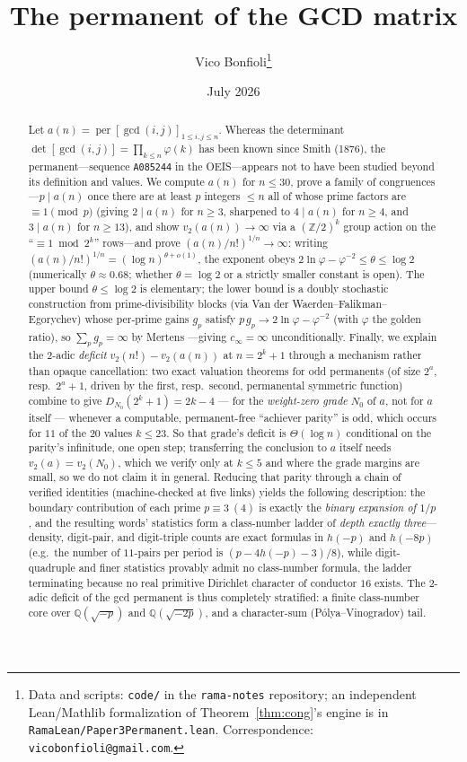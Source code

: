 \documentclass[11pt]{article}
\title{The permanent of the GCD matrix}
\author{Vico Bonfioli\thanks{Data and scripts: \texttt{code/} in the
\texttt{rama-notes} repository; an independent Lean/Mathlib formalization of
Theorem~\ref{thm:cong}'s engine is in \texttt{RamaLean/Paper3Permanent.lean}. Correspondence: \texttt{vicobonfioli@gmail.com}.}}
\date{July 2026}
\theoremstyle{remark}\newtheorem{remark}[theorem]{Remark}
\DeclareMathOperator{\perm}{per}
\begin{document}
\maketitle

\begin{abstract}
Let $a(n)=\perm[\gcd(i,j)]_{1\le i,j\le n}$. Whereas the determinant
$\det[\gcd(i,j)]=\prod_{k\le n}\varphi(k)$ has been known since Smith (1876),
the permanent---sequence \texttt{A085244} in the OEIS---appears not to have been
studied beyond its definition and values. We compute $a(n)$ for
$n\le 30$, prove a family of congruences---$p\mid a(n)$ once there are at least
$p$ integers $\le n$ all of whose prime factors are $\equiv 1\pmod p$ (giving
$2\mid a(n)$ for $n\ge 3$, sharpened to $4\mid a(n)$ for $n\ge4$, and
$3\mid a(n)$ for $n\ge 13$), and show $v_2(a(n))\to\infty$ via a
$(\mathbb Z/2)^k$ group action on the ``$\equiv1\bmod 2^k$'' rows---and prove
$(a(n)/n!)^{1/n}\to\infty$: writing $(a(n)/n!)^{1/n}=(\log n)^{\theta+o(1)}$, the
exponent obeys $2\ln\varphi-\varphi^{-2}\le\theta\le\log2$ (numerically
$\theta\approx0.68$; whether $\theta=\log2$ or a strictly smaller constant is
open). The upper bound $\theta\le\log2$ is
elementary; the lower bound is a doubly stochastic construction from
prime-divisibility blocks (via Van der Waerden--Falikman--Egorychev) whose
per-prime gains $g_p$ satisfy $p\,g_p\to 2\ln\varphi-\varphi^{-2}$ (with
$\varphi$ the golden ratio), so
$\sum_pg_p=\infty$ by Mertens \cite{HW}---giving $c_\infty=\infty$ unconditionally.
Finally, we explain the $2$-adic \emph{deficit} $v_2(n!)-v_2(a(n))$ at $n=2^k+1$ through a
mechanism rather than opaque cancellation: two exact valuation theorems for odd permanents (of size
$2^a$, resp.\ $2^a+1$, driven by the first, resp.\ second, permanental symmetric function) combine to
give $D_{N_0}(2^k+1)=2k-4$ --- for the \emph{weight-zero grade} $N_0$ of $a$, not for $a$ itself ---
whenever a computable, permanent-free ``achiever parity'' is odd, which occurs for $11$ of the $20$
values $k\le23$. So that grade's deficit is $\Theta(\log n)$ conditional on the parity's infinitude,
one open step; transferring the conclusion to $a$ itself needs $v_2(a)=v_2(N_0)$, which we verify only
at $k\le5$ and where the grade margins are small, so we do not claim it in general. Reducing that parity through a chain of verified identities
(machine-checked at five links) yields the following description: the boundary contribution of each
prime $p\equiv3\ (4)$ is exactly the \emph{binary expansion of $1/p$}, and the resulting words'
statistics form a class-number ladder of \emph{depth exactly three}---density, digit-pair, and
digit-triple counts are exact formulas in $h(-p)$ and $h(-8p)$ (e.g.\ the number of $11$-pairs per
period is $(p-4h(-p)-3)/8$), while digit-quadruple and finer statistics provably admit no
class-number formula, the ladder terminating because no real primitive Dirichlet character of
conductor $16$ exists. The $2$-adic deficit of the gcd permanent is thus completely stratified: a
finite class-number core over $\mathbb Q(\sqrt{-p})$ and $\mathbb Q(\sqrt{-2p})$, and a
character-sum (Pólya--Vinogradov) tail.
\end{abstract}
\end{document}

